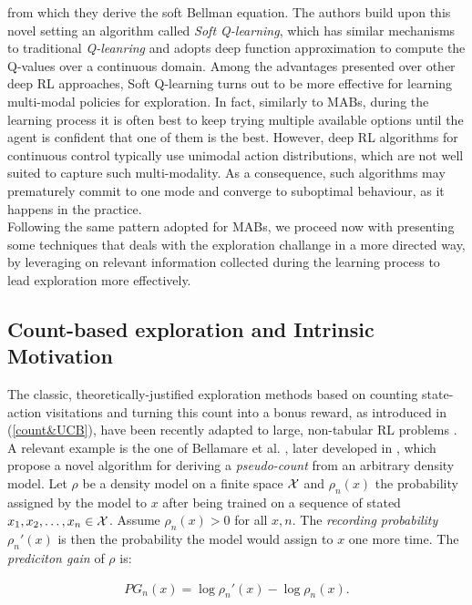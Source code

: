from which they derive the soft Bellman equation. The authors build upon this novel setting an algorithm called \emph{Soft Q-learning}, which has similar mechanisms to traditional \emph{Q-leanring} and adopts deep function approximation to compute the Q-values over a continuous domain. Among the advantages presented over other deep \gls{RL} approaches, Soft Q-learning turns out to be more effective for learning multi-modal policies for exploration. In fact, similarly to \gls{MAB}s, during the learning process it is often best to keep trying multiple available options until the agent is confident that one of them is the best. However, deep \gls{RL} algorithms for continuous control typically use unimodal action distributions, which are not well suited to capture such multi-modality. As a consequence, such algorithms may prematurely commit to one mode and converge to suboptimal behaviour, as it happens in the practice. \\
Following the same pattern adopted for \gls{MAB}s, we proceed now with presenting some techniques that deals with the exploration challange in a more directed way, \ie by leveraging on relevant information collected during the learning process to lead exploration more effectively.

\subsection{Count-based exploration and Intrinsic Motivation}
The classic, theoretically-justified exploration methods based on counting state-action visitations and turning this count into a bonus reward, as introduced in (\ref{count&UCB}), have been recently adapted to large, non-tabular \gls{RL} problems \cite{bellemare2016unifying, tang2017exploration, ostrovski2017count, choshen2018dora}. A relevant example is the one of Bellamare et al. \cite{bellemare2016unifying}, later developed in \cite{ostrovski2017count}, which propose a novel algorithm for deriving a \emph{pseudo-count} from an arbitrary density model. 
Let $\rho$ be a density model on a finite space $\mathcal{X}$ and $\rho_n(x)$ the probability assigned by the model to $x$ after being trained on a sequence of stated $x_1,x_2,\dots,x_n\in\mathcal{X}$. Assume $\rho_n(x)>0$ for all $x,n$. The \emph{recording probability} $\rho_n'(x)$ is then the probability the model would assign to $x$ one more time. The \emph{prediciton gain} of $\rho$ is:

\begin{align}
PG_n(x) = \log\rho_n'(x) - \log\rho_n(x).
\end{align}

